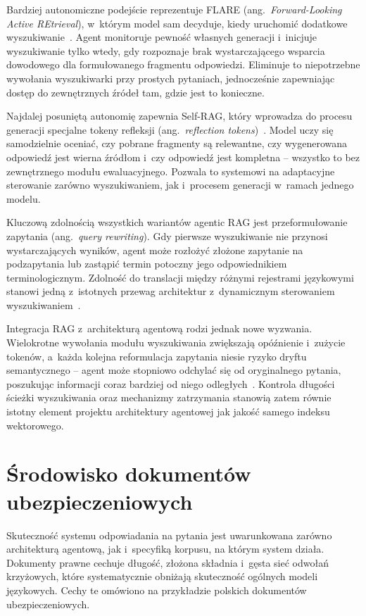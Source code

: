 Bardziej autonomiczne podejście reprezentuje FLARE
(ang.~\textit{Forward-Looking Active REtrieval}), w~którym model sam decyduje,
kiedy uruchomić dodatkowe wyszukiwanie~\cite{jiang2023active}. Agent monitoruje
pewność własnych generacji i~inicjuje wyszukiwanie tylko wtedy, gdy rozpoznaje
brak wystarczającego wsparcia dowodowego dla formułowanego fragmentu
odpowiedzi. Eliminuje to niepotrzebne wywołania wyszukiwarki przy prostych
pytaniach, jednocześnie zapewniając dostęp do zewnętrznych źródeł tam, gdzie
jest to konieczne.

Najdalej posuniętą autonomię zapewnia Self-RAG, który wprowadza do procesu
generacji specjalne tokeny refleksji (ang.~\textit{reflection
  tokens})~\cite{asai2023self}. Model uczy się samodzielnie oceniać, czy pobrane
fragmenty są relewantne, czy wygenerowana odpowiedź jest wierna źródłom i~czy
odpowiedź jest kompletna -- wszystko to bez zewnętrznego modułu ewaluacyjnego.
Pozwala to systemowi na adaptacyjne sterowanie zarówno wyszukiwaniem, jak
i~procesem generacji w~ramach jednego modelu.

Kluczową zdolnością wszystkich wariantów agentic RAG jest przeformułowanie
zapytania (ang.~\textit{query rewriting}). Gdy pierwsze wyszukiwanie nie
przynosi wystarczających wyników, agent może rozłożyć złożone zapytanie na
podzapytania lub zastąpić termin potoczny jego odpowiednikiem terminologicznym.
Zdolność do translacji między różnymi rejestrami językowymi stanowi jedną
z~istotnych przewag architektur z~dynamicznym sterowaniem
wyszukiwaniem~\cite{gao2023precise}.

Integracja RAG z~architekturą agentową rodzi jednak nowe wyzwania. Wielokrotne
wywołania modułu wyszukiwania zwiększają opóźnienie i~zużycie tokenów, a~każda
kolejna reformulacja zapytania niesie ryzyko dryftu semantycznego -- agent może
stopniowo odchylać się od oryginalnego pytania, poszukując informacji coraz
bardziej od niego odległych~\cite{wang2024survey}. Kontrola długości ścieżki
wyszukiwania oraz mechanizmy zatrzymania stanowią zatem równie istotny element
projektu architektury agentowej jak jakość samego indeksu wektorowego.

\section{Środowisko dokumentów ubezpieczeniowych}\label{sec:srodowisko-dokumentow-ubezpieczeniowych}

Skuteczność systemu odpowiadania na pytania jest uwarunkowana zarówno
architekturą agentową, jak i~specyfiką korpusu, na którym system działa.
Dokumenty prawne cechuje długość, złożona składnia i~gęsta sieć odwołań
krzyżowych, które systematycznie obniżają skuteczność ogólnych modeli
językowych. Cechy te omówiono na przykładzie polskich dokumentów
ubezpieczeniowych.

